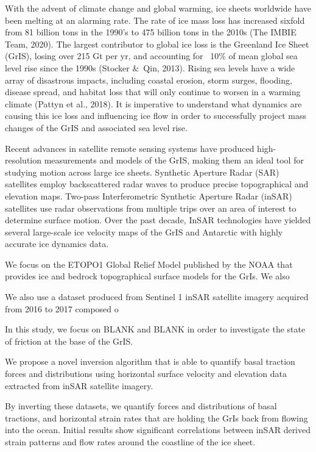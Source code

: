 \documentclass{article}
\begin{document}
With the advent of climate change and global warming, ice sheets worldwide have been melting at an alarming rate. The rate of ice mass loss has increased sixfold from 81 billion tons in the 1990’s to 475 billion tons in the 2010s (The IMBIE Team, 2020). The largest contributor to global ice loss is the Greenland Ice Sheet (GrIS), losing over 215 Gt per yr, and accounting for ~10\% of mean global sea level rise since the 1990s (Stocker \&\ Qin, 2013). Rising sea levels have a wide array of disastrous impacts, including coastal erosion, storm surges, flooding, disease spread, and habitat loss that will only continue to worsen in a warming climate (Pattyn et al., 2018). It is imperative to understand what dynamics are causing this ice loss and influencing ice flow in order to successfully project mass changes of the GrIS and associated sea level rise.

Recent advances in satellite remote sensing systems have produced high-resolution measurements and models of the GrIS, making them an ideal tool for studying motion across large ice sheets. Synthetic Aperture Radar (SAR) satellites employ backscattered radar waves to produce precise topographical and elevation maps. Two-pass Interferometric Synthetic Aperture Radar (inSAR) satellites use radar observations from multiple trips over an area of interest to determine surface motion. Over the past decade, InSAR technologies have yielded several large-scale ice velocity maps of the GrIS and Antarctic with highly accurate ice dynamics data. 

We focus on the ETOPO1 Global Relief Model published by the NOAA that provides ice and bedrock topographical surface models for the GrIs. We also 

We also use a dataset produced from Sentinel 1 inSAR satellite imagery acquired from 2016 to 2017 composed o

In this study, we focus on BLANK and BLANK in order to investigate the state of friction at the base of the GrIS. 

We propose a novel inversion algorithm that is able to quantify basal traction forces and distributions using horizontal surface velocity and elevation data extracted from inSAR satellite imagery.

By inverting these datasets, we quantify forces and distributions of basal tractions, and horizontal strain rates that are holding the GrIs back from flowing into the ocean. Initial results show significant correlations between inSAR derived strain patterns and flow rates around the coastline of the ice sheet.
\end{document}
